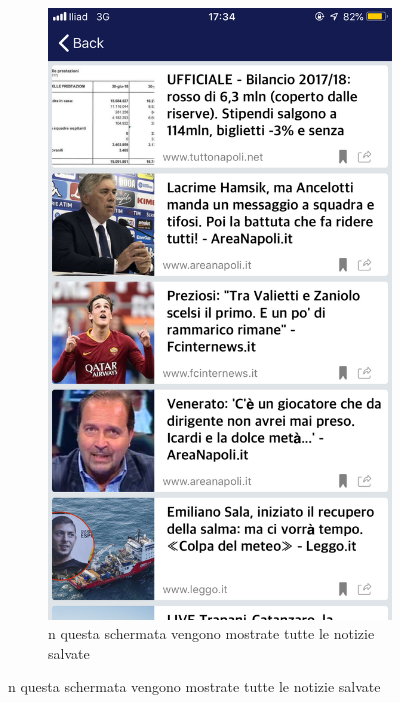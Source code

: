 \documentclass[numbers=noenddot, 12pt, a4paper, oneside]{scrbook}
\begin{document}
\begin{figure}[H]
\begin{subfigure}{.5\textwidth}
		\includegraphics[width=.8\linewidth]{images/Screen/NewsFavorite}
		\caption{n questa schermata vengono mostrate tutte le notizie salvate}
	\end{subfigure}
\end{figure}
\end{document}
